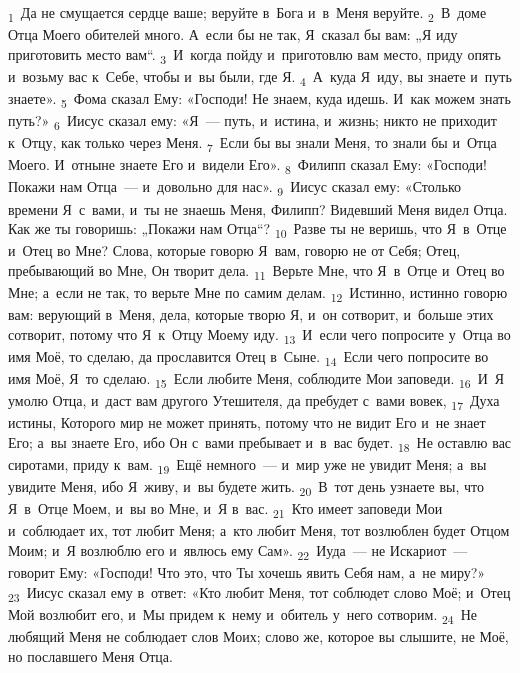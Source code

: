 \documentclass[a4paper,12pt]{article}
\begin{document}
\textsubscript{1}~Да не смущается сердце ваше; веруйте в~Бога и~в~Меня веруйте.
\textsubscript{2}~В~доме Отца Моего обителей много. А~если бы не так, Я~сказал бы вам: „Я иду приготовить место вам“.
\textsubscript{3}~И~когда пойду и~приготовлю вам место, приду опять и~возьму вас к~Себе, чтобы и~вы были, где Я.
\textsubscript{4}~А~куда Я~иду, вы знаете и~путь знаете».
\textsubscript{5}~Фома сказал Ему: «Господи! Не знаем, куда идешь. И~как можем знать путь?»
\textsubscript{6}~Иисус сказал ему: «Я~--- путь, и~истина, и~жизнь; никто не приходит к~Отцу, как только через Меня.
\textsubscript{7}~Если бы вы знали Меня, то знали бы и~Отца Моего. И~отныне знаете Его и~видели Его».
\textsubscript{8}~Филипп сказал Ему: «Господи! Покажи нам Отца~--- и~довольно для нас».
\textsubscript{9}~Иисус сказал ему: «Столько времени Я~с~вами, и~ты не знаешь Меня, Филипп? Видевший Меня видел Отца. Как же ты говоришь: „Покажи нам Отца“?
\textsubscript{10}~Разве ты не веришь, что Я~в~Отце и~Отец во Мне? Слова, которые говорю Я~вам, говорю не от Себя; Отец, пребывающий во Мне, Он творит дела.
\textsubscript{11}~Верьте Мне, что Я~в~Отце и~Отец во Мне; а~если не так, то верьте Мне по самим делам.
\textsubscript{12}~Истинно, истинно говорю вам: верующий в~Меня, дела, которые творю Я, и~он сотворит, и~больше этих сотворит, потому что Я~к~Отцу Моему иду.
\textsubscript{13}~И~если чего попросите у~Отца во имя Моё, то сделаю, да прославится Отец в~Сыне.
\textsubscript{14}~Если чего попросите во имя Моё, Я~то сделаю.
\textsubscript{15}~Если любите Меня, соблюдите Мои заповеди.
\textsubscript{16}~И~Я умолю Отца, и~даст вам другого Утешителя, да пребудет с~вами вовек,
\textsubscript{17}~Духа истины, Которого мир не может принять, потому что не видит Его и~не знает Его; а~вы знаете Его, ибо Он с~вами пребывает и~в~вас будет.
\textsubscript{18}~Не оставлю вас сиротами, приду к~вам.
\textsubscript{19}~Ещё немного~--- и~мир уже не увидит Меня; а~вы увидите Меня, ибо Я~живу, и~вы будете жить.
\textsubscript{20}~В~тот день узнаете вы, что Я~в~Отце Моем, и~вы во Мне, и~Я в~вас.
\textsubscript{21}~Кто имеет заповеди Мои и~соблюдает их, тот любит Меня; а~кто любит Меня, тот возлюблен будет Отцом Моим; и~Я возлюблю его и~явлюсь ему Сам».
\textsubscript{22}~Иуда~--- не Искариот~--- говорит Ему: «Господи! Что это, что Ты хочешь явить Себя нам, а~не миру?»
\textsubscript{23}~Иисус сказал ему в~ответ: «Кто любит Меня, тот соблюдет слово Моё; и~Отец Мой возлюбит его, и~Мы придем к~нему и~обитель у~него сотворим.
\textsubscript{24}~Не любящий Меня не соблюдает слов Моих; слово же, которое вы слышите, не Моё, но пославшего Меня Отца.
\end{document}
